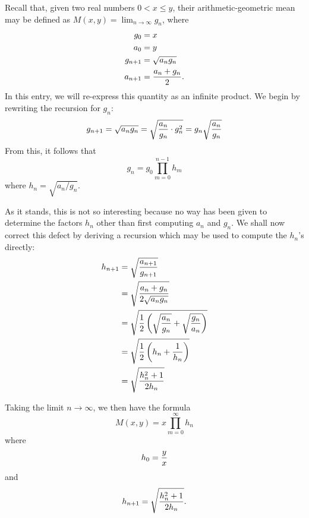 \documentclass[12pt]{article}
\begin{document}
Recall that, given two real numbers $0 < x \le y$, their arithmetic-geometric
mean may be defined as $M(x,y) = \lim_{n \to \infty} g_n$, where
\begin{align*}
g_0 &= x \\
a_0 &= y \\
g_{n+1} &= \sqrt{a_n g_n} \\
a_{n+1} &= {a_n + g_n \over 2} .
\end{align*}
In this entry, we will re-express this quantity as an infinite product.
We begin by rewriting the recursion for $g_n$:
\[
g_{n+1} = \sqrt{a_n g_n} =
\sqrt{ {a_n \over g_n} \cdot g_n^2 } =
g_n \sqrt{a_n \over g_n}
\]
From this, it follows that
\[
g_n = g_0 \prod_{m=0}^{n-1} h_m
\]
where $h_n = \sqrt{a_n / g_n}$.

As it stands, this is not so interesting because no way has been given
to determine the factors $h_n$ other than first computing $a_n$ and 
$g_n$.  We shall now correct this defect by deriving a recursion which
may be used to compute the $h_n$'s directly:
\begin{align*}
h_{n+1} &= \sqrt{a_{n+1} \over g_{n+1}} \\
&= \sqrt{a_n + g_n \over 2 \sqrt{a_n g_n}} \\
&= \sqrt{ {1 \over 2} 
\left(
\sqrt{a_n \over g_n} +
\sqrt{g_n \over a_n}
\right)} \\
&= \sqrt{ {1 \over 2}
\left(
h_n + {1 \over h_n}
\right)} \\
&= \sqrt{h_n^2 + 1 \over 2 h_n}
\end{align*}

Taking the limit $n \to \infty$, we then have the formula
\[
M(x,y) = x \prod_{m=0}^\infty h_n
\]
where
\[
h_0 = {y \over x}
\]
and
\[
h_{n+1} = \sqrt{h_n^2 + 1 \over 2 h_n} .
\]
\end{document}
